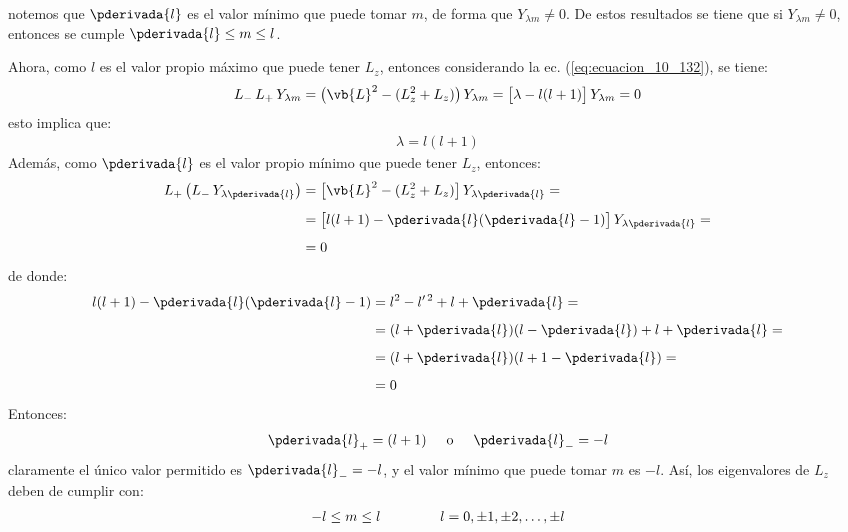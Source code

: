 notemos que $\pderivada{l}$ es el valor mínimo que puede tomar $m$, de forma que $Y_{\lambda m} \neq 0$. De estos resultados se tiene que si $Y_{\lambda m} \neq 0$, entonces se cumple $\pderivada{l} \leq m \leq l$.
\par
Ahora, como $l$ es el valor propio máximo que puede tener $L_{z}$, entonces considerando la ec. (\ref{eq:ecuacion_10_132}), se tiene:
\begin{align}
L_{-} \, L_{+} \, Y_{\lambda m} = \big( \vb{L}^{2} - (L_{z}^{2} + L_{z}) \big) \, Y_{\lambda m} = \big[ \lambda - l (l + 1) \big] \, Y_{\lambda m} = 0
\end{align}
esto implica que:
\begin{align*}
\lambda = l (l + 1)
\end{align*}
Además, como $\pderivada{l}$ es el valor propio mínimo que puede tener $L_{z}$, entonces:
\begin{align*}
L_{+} \, \big( L_{-} \, Y_{\lambda \pderivada{l}} \big) &= \big[ \vb{L}^{2} - (L_{z}^{2} + L_{z}) \big] \, Y_{\lambda \pderivada{l}} = \\[0.5em]
&= \big[ l (l + 1) - \pderivada{l} (\pderivada{l} - 1) \big] \, Y_{\lambda \pderivada{l}} = \\[0.5em]
&= 0
\end{align*}
de donde:
\begin{align}
\begin{aligned}[b]
l (l + 1) - \pderivada{l} (\pderivada{l} - 1) &= l^{2} - l^{\prime \, 2} + l + \pderivada{l} = \\[0.5em]
&= (l + \pderivada{l})(l - \pderivada{l}) + l + \pderivada{l} = \\[0.5em]
&= (l + \pderivada{l})(l + 1 - \pderivada{l}) = \\[0.5em]
&= 0
\end{aligned}
\label{eq:ecuacion_10_148}
\end{align}
Entonces:
\begin{align}
\pderivada{l}_{+} = (l + 1) \hspace{0.5cm} \mbox{o} \hspace{0.5cm} \pderivada{l}_{-} = - l
\label{eq:ecuacion_10_149}
\end{align}
claramente el único valor permitido es $\pderivada{l}_{-} = - l$, y el valor mínimo que puede tomar $m$ es $-l$. Así, los eigenvalores de $L_{z}$ deben de cumplir con:
\begin{align}
-l \leq m \leq l \hspace{1.5cm} l = 0, \pm 1, \pm 2, \ldots, \pm l
\label{eq:ecuacion_10_150}
\end{align}

